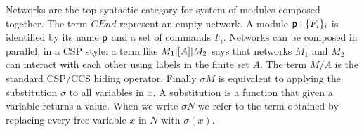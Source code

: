 Networks are the top syntactic category for system of modules composed
together. The term $CEnd$ represent an empty network. A module
$\textsf{p}:\{F_i\}_i$ is identified by its name $\textsf{p}$ and a set of
commands $F_i$. Networks can be composed in parallel, in a CSP style:
a term like $M_1 |[A]| M_2$ says that networks $M_1$ and $M_2$ can
interact with each other using labels in the finite set $A$. The term
$M/A$ is the standard CSP/CCS hiding operator. Finally $\sigma M$ is
equivalent to applying the substitution $\sigma$ to all variables in
$x$. A substitution is a function that given a variable returns a
value. When we write $\sigma N$ we refer to the term obtained by
replacing every free variable $x$ in $N$ with $\sigma(x)$. 


